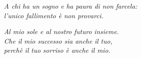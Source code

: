 

\begin{flushright}
    \textit{
        A chi ha un sogno e ha paura di non farcela: \\
        l'unico fallimento è non provarci.\\
        }
    
    \medskip
    \textit{
        Al mio sole e al nostro futuro insieme.\\
        Che il mio successo sia anche il tuo, \\
        perchè il tuo sorriso è anche il mio.
    }
\end{flushright}
